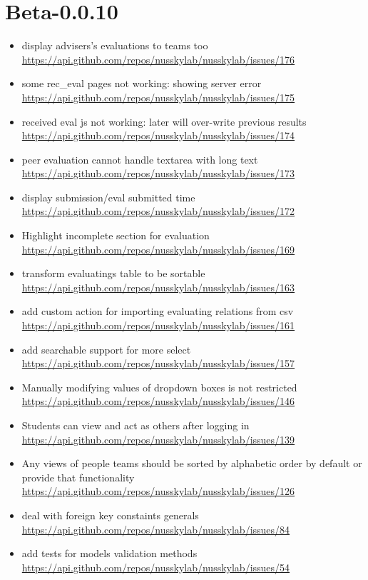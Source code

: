 {\section{Beta-0.0.10}
\begin{itemize}[noitemsep]
    \item display advisers's evaluations to teams too \url{https://api.github.com/repos/nusskylab/nusskylab/issues/176} 
    \item some rec\_eval pages not working: showing server error \url{https://api.github.com/repos/nusskylab/nusskylab/issues/175} 
    \item received eval js not working: later will over-write previous results \url{https://api.github.com/repos/nusskylab/nusskylab/issues/174} 
    \item peer evaluation cannot handle textarea with long text \url{https://api.github.com/repos/nusskylab/nusskylab/issues/173} 
    \item display submission/eval submitted time \url{https://api.github.com/repos/nusskylab/nusskylab/issues/172} 
    \item Highlight incomplete section for evaluation \url{https://api.github.com/repos/nusskylab/nusskylab/issues/169} 
    \item transform evaluatings table to be sortable \url{https://api.github.com/repos/nusskylab/nusskylab/issues/163} 
    \item add custom action for importing evaluating relations from csv \url{https://api.github.com/repos/nusskylab/nusskylab/issues/161} 
    \item add searchable support for more select \url{https://api.github.com/repos/nusskylab/nusskylab/issues/157} 
    \item Manually modifying values of dropdown boxes is not restricted \url{https://api.github.com/repos/nusskylab/nusskylab/issues/146} 
    \item Students can view and act as others after logging in \url{https://api.github.com/repos/nusskylab/nusskylab/issues/139} 
    \item Any views of people  teams should be sorted by alphabetic order by default or provide that functionality \url{https://api.github.com/repos/nusskylab/nusskylab/issues/126} 
    \item deal with foreign key constaints generals \url{https://api.github.com/repos/nusskylab/nusskylab/issues/84} 
    \item add tests for models validation methods \url{https://api.github.com/repos/nusskylab/nusskylab/issues/54} 
\end{itemize}

}

